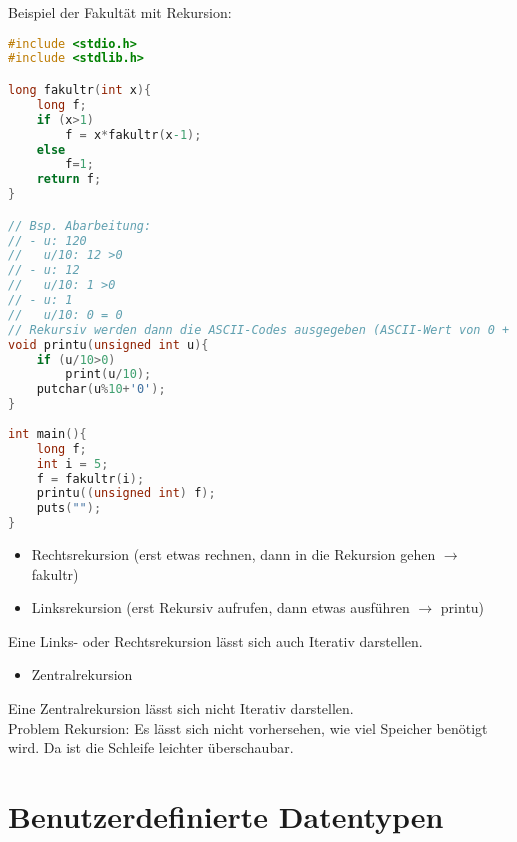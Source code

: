 Beispiel der Fakultät mit Rekursion:
\begin{lstlisting}[language=C]
#include <stdio.h>
#include <stdlib.h>

long fakultr(int x){
	long f;
	if (x>1) 
		f = x*fakultr(x-1);
	else 
		f=1;
	return f;
}

// Bsp. Abarbeitung:
// - u: 120
//   u/10: 12 >0
// - u: 12 
//   u/10: 1 >0
// - u: 1
//   u/10: 0 = 0
// Rekursiv werden dann die ASCII-Codes ausgegeben (ASCII-Wert von 0 + Zahl)
void printu(unsigned int u){
	if (u/10>0)
		print(u/10);
	putchar(u%10+'0');
}
	
int main(){
	long f;
	int i = 5;
	f = fakultr(i);
	printu((unsigned int) f);
	puts("");
}
\end{lstlisting}
\begin{itemize}
\item Rechtsrekursion (erst etwas rechnen, dann in die Rekursion gehen $\rightarrow$ fakultr)
\item Linksrekursion (erst Rekursiv aufrufen, dann etwas ausführen $\rightarrow$ printu)
\end{itemize}
Eine Links- oder Rechtsrekursion lässt sich auch Iterativ darstellen.
\begin{itemize}
\item Zentralrekursion
\end{itemize}
Eine Zentralrekursion lässt sich nicht Iterativ darstellen.\medskip\\
Problem Rekursion: Es lässt sich nicht vorhersehen, wie viel Speicher benötigt wird. Da ist die Schleife leichter überschaubar.

\section{Benutzerdefinierte Datentypen}

